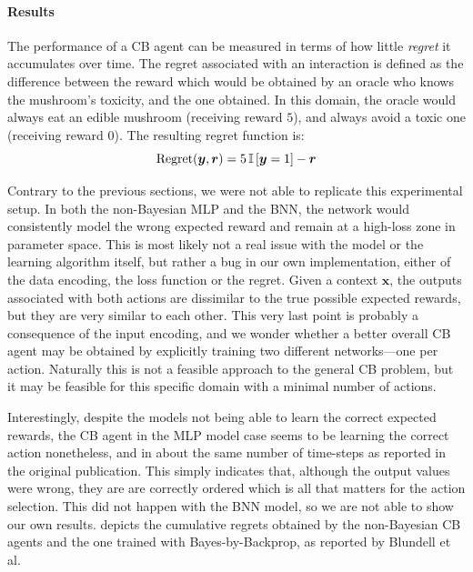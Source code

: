 \documentclass[11pt]{article}
\begin{document}
\paragraph{Results} 

The performance of a CB agent can be measured in terms of how little
\emph{regret} it accumulates over time.  The regret associated with an
interaction is defined as the difference between the reward which would be
obtained by an oracle who knows the mushroom's toxicity, and the one obtained.
In this domain, the oracle would always eat an edible mushroom (receiving
reward $5$), and always avoid a toxic one (receiving reward $0$).  The
resulting regret function is:
%
\begin{equation}
  \operatorname{Regret}(\bm y, \bm r) = 5 \, {\mathbb{I}}\left[ \bm y = 1 \right] - \bm
  r
\end{equation}

Contrary to the previous sections, we were not able to replicate this
experimental setup.  In both the non-Bayesian MLP and the BNN, the network
would consistently model the wrong expected reward and remain at a high-loss
zone in parameter space.  This is most likely not a real issue with the model
or the learning algorithm itself, but rather a bug in our own implementation,
either of the data encoding, the loss function or the regret.  Given a context
$\bm x$, the outputs associated with both actions are dissimilar to the true
possible expected rewards, but they are very similar to each other.  This very
last point is probably a consequence of the input encoding, and we wonder
whether a better overall CB agent may be obtained by explicitly training two
different networks---one per action.  Naturally this is not a feasible approach
to the general CB problem, but it may be feasible for this specific domain with
a minimal number of actions.

Interestingly, despite the models not being able to learn the correct expected
rewards, the CB agent in the MLP model case seems to be learning the correct
action nonetheless, and in about the same number of time-steps as reported in
the original publication.  This simply indicates that, although the output
values were wrong, they are are correctly ordered which is all that matters for
the action selection.  This did not happen with the BNN model, so we are not
able to show our own results.   depicts the cumulative
regrets obtained by the non-Bayesian CB agents and the one trained with
Bayes-by-Backprop, as reported by Blundell et al.  
\end{document}

